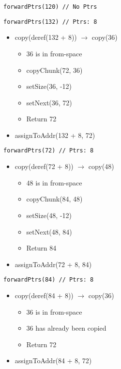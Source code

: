 \documentclass[12pt, letterpaper]{article}
\begin{document}
\begin{minipage}[t]{0.5\textwidth}
\begin{lstlisting}
forwardPtrs(120) // No Ptrs
\end{lstlisting}
\begin{lstlisting}
forwardPtrs(132) // Ptrs: 8
\end{lstlisting}
	\begin{itemize}
		\item copy(deref(132 + 8)) \(\rightarrow\) copy(36)
		\begin{itemize}
			\item 36 is in from-space
			\item copyChunk(72, 36)
			\item setSize(36, -12)
			\item setNext(36, 72)
			\item Return 72
		\end{itemize}		
		\item assignToAddr(132 + 8, 72)
	\end{itemize}
\begin{lstlisting}
forwardPtrs(72) // Ptrs: 8
\end{lstlisting}
	\begin{itemize}
		\item copy(deref(72 + 8)) \(\rightarrow\) copy(48)
			\begin{itemize}
				\item 48 is in from-space
				\item copyChunk(84, 48)
				\item setSize(48, -12)
				\item setNext(48, 84)
				\item Return 84
			\end{itemize}
		\item assignToAddr(72 + 8, 84)
	\end{itemize}
\begin{lstlisting}
forwardPtrs(84) // Ptrs: 8
\end{lstlisting}
	\begin{itemize}
		\item copy(deref(84 + 8)) \(\rightarrow\) copy(36)
			\begin{itemize}
				\item 36 is in from-space
				\item 36 has already been copied
				\item Return 72
			\end{itemize}
		\item assignToAddr(84 + 8, 72)	
	\end{itemize}
\end{minipage}
\end{document}
